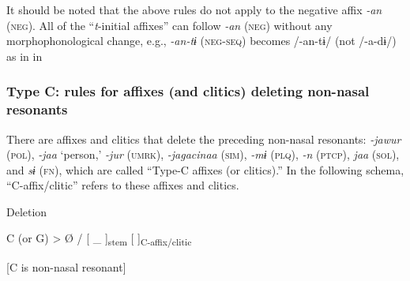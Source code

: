 It should be noted that the above rules do not apply to the negative affix \textit{-an} (\textsc{neg}). All of the “\textit{t}-initial affixes” can follow \textit{-an} (\textsc{neg}) without any morphophonological change, e.g., \textit{-an-tɨ} (\textsc{neg}-\textsc{seq}) becomes /-an-tɨ/ (not /-a-dɨ/) as in  in 

\subsubsection{Type C: rules for affixes (and clitics) deleting non-nasal resonants}
\label{bkm:Ref347177215}
There are affixes and clitics that delete the preceding non-nasal resonants: \textit{-jawur} (\textsc{pol}), \textit{-jaa} ‘person,’ \textit{-jur} (\textsc{umrk}), \textit{-jagacinaa} (\textsc{sim}), \textit{-mɨ} (\textsc{plq}), \textit{-n} (\textsc{ptcp}), \textit{jaa} (\textsc{sol}), and \textit{sɨ} (\textsc{fn}), which are called “Type-C affixes (or clitics).” In the following schema, “C-affix/clitic” refers to these affixes and clitics.

\ea\label{ex:8-14}
  Deletion

  C (or G)  >  Ø  /  [   \_ ]\textsubscript{stem}  [   ]\textsubscript{C-affix/clitic}

  [C is non-nasal resonant]
\z

